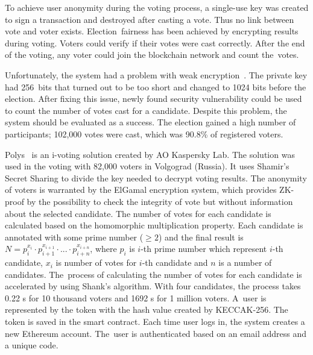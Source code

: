 \documentclass[applsci,article,accept,moreauthors,pdftex]{Definitions/mdpi}
\begin{document}
To achieve user anonymity during the voting process, a single-use key was created to sign a transaction and destroyed after casting a vote. Thus no link between vote and voter exists. Election~fairness has been achieved by encrypting results during voting. Voters could verify if their votes were cast correctly. After the end of the voting, any voter could join the blockchain network and count the~votes.


Unfortunately, the system had a problem with weak encryption~\cite{gaudry2019breaking}.
The private key had 256~bits that turned out to be too short and changed to 1024 bits before the election. After fixing this issue, newly found security vulnerability could be used to count the number of votes cast for a candidate.
Despite this problem, the system should be evaluated as a success. The election gained a high number of participants; 102,000 votes were cast, which was 90.8\% of registered voters.


Polys~\cite{polys:online} is an i-voting solution created by AO Kaspersky Lab. The solution was used in the voting with 82,000  
voters in Volgograd (Russia). It uses Shamir's Secret Sharing to divide the key needed to decrypt voting results. The anonymity of voters is warranted by the ElGamal encryption system, which provides ZK-proof by the possibility to check the integrity of vote but without information about the selected candidate. The number of votes for each candidate is calculated based on the homomorphic multiplication property. Each candidate is annotated with some prime number ($\ge2$) and the final result is $N=p_i^{x_i} \cdot p_{i+1}^{x_{i+1}} \cdot ... \cdot p_{i+n}^{x_{i+n}}$, where $p_i$ is $i$-th prime number which represent $i$-th candidate, $x_i$ is number of votes for $i$-th candidate and $n$ is a number of candidates. The~process of calculating the number of votes for each candidate is accelerated by using Shank's algorithm. With four candidates, the process takes 0.22 s for 10 thousand voters and 1692 s for 1 million voters. A~user is represented by the token with the hash value created by KECCAK-256. The token is saved in the smart contract. Each time user logs in, the system creates a new Ethereum account. The~user is authenticated based on an email address and a unique code.
\end{document}
